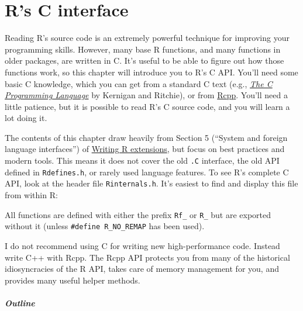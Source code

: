 \chapter{R's C interface}\label{c-api}

Reading R's source code is an extremely powerful technique for improving
your programming skills. However, many base R functions, and many
functions in older packages, are written in C. It's useful to be able to
figure out how those functions work, so this chapter will introduce you
to R's C API. You'll need some basic C knowledge, which you can get from
a standard C text (e.g.,
\href{http://amzn.com/0131101633?tag=devtools-20}{\emph{The C
Programming Language}} by Kernigan and Ritchie), or from
\hyperref[rcpp]{Rcpp}. You'll need a little patience, but it is possible
to read R's C source code, and you will learn a lot doing it. 

The contents of this chapter draw heavily from Section 5 (``System and
foreign language interfaces'') of
\href{http://cran.r-project.org/doc/manuals/R-exts.html}{Writing R
extensions}, but focus on best practices and modern tools. This means it
does not cover the old \texttt{.C} interface, the old API defined in
\texttt{Rdefines.h}, or rarely used language features. To see R's
complete C API, look at the header file \texttt{Rinternals.h}. It's
easiest to find and display this file from within R:

\begin{Shaded}
\begin{Highlighting}[]
\StringTok{ }\NormalTok{(}\NormalTok{(}\NormalTok{), }\NormalTok{)}
\end{Highlighting}
\end{Shaded}

All functions are defined with either the prefix \texttt{Rf\_} or
\texttt{R\_} but are exported without it (unless
\texttt{\#define R\_NO\_REMAP} has been used).

I do not recommend using C for writing new high-performance code.
Instead write C++ with Rcpp. The Rcpp API protects you from many of the
historical idiosyncracies of the R API, takes care of memory management
for you, and provides many useful helper methods.

\paragraph{Outline}

